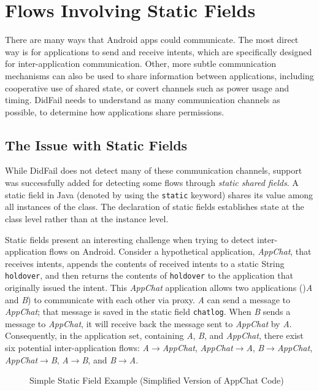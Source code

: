\newpage
{}
\chapter{Flows Involving Static Fields} \label{chap:static_fields}

There are many ways that Android apps could communicate. The most direct way is for applications to send and receive intents, which are specifically designed for inter-application communication. Other, more subtle communication mechanisms can also be used to share information between applications, including cooperative use of shared state, or covert channels such as power usage and timing. DidFail needs to understand as many communication channels as possible, to determine how applications share permissions.

\section{The Issue with Static Fields}

While DidFail does not detect many of these communication channels, support was successfully added for detecting some flows through \emph{static shared fields}. A static field in Java (denoted by using the \texttt{static} keyword) shares its value among all instances of the class. The declaration of static fields establishes state at the class level rather than at the instance level.

Static fields present an interesting challenge when trying to detect inter-application flows on Android. Consider a hypothetical application, \emph{AppChat}, that receives intents, appends the contents of received intents to a static String \texttt{holdover}, and then returns the contents of \texttt{holdover} to the application that originally issued the intent. This \emph{AppChat} application allows two applications ()\emph{A} and \emph{B}) to communicate with each other via proxy. \emph{A} can send a message to \emph{AppChat}; that message is saved in the static field \texttt{chatlog}. When \emph{B} sends a message to \emph{AppChat}, it will receive back the message sent to \emph{AppChat} by \emph{A}. Consequently, in the application set, containing \emph{A}, \emph{B}, and \emph{AppChat}, there exist six potential inter-application flows: \emph{A$\rightarrow$AppChat}, \emph{AppChat$\rightarrow$A}, \emph{B$\rightarrow$AppChat}, \emph{AppChat$\rightarrow$B}, \emph{A$\rightarrow$B}, and \emph{B$\rightarrow$A}.

\begin{figure}
\begin{framed}

\caption{Simple Static Field Example (Simplified Version of AppChat Code)}
\label{fig:appchat}
\end{framed}
\end{figure}

